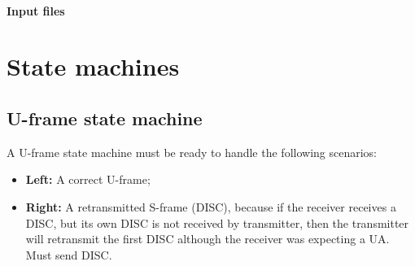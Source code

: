 \documentclass[a4paper, 11pt]{report}
\begin{document}
\begin{multicols}{2}
\subsubsection{Input files}



\end{multicols}

\restoregeometry

\chapter{State machines} \label{ch:automatons}
\section{U-frame state machine}

A U-frame state machine must be ready to handle the following scenarios:
\begin{itemize}
	\item \textbf{Left:} A correct U-frame;
	\item \textbf{Right:} A retransmitted S-frame (DISC), because if the receiver receives a DISC, but its own DISC is not received by transmitter, then the transmitter will retransmit the first DISC although the receiver was expecting a UA. Must send DISC.
\end{itemize}
\end{document}
